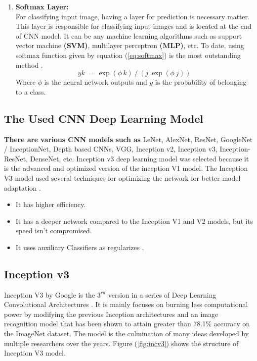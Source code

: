 \begin{enumerate}
    \item {\bf Softmax Layer:} \\[5pt]
        For classifying input image, having a layer for prediction is necessary matter. 
        This layer is responsible for classifying input images and is located at the end 
        of CNN model. It can be any machine learning algorithms such as support vector machine 
        {\bf (SVM)}, multilayer perceptron {\bf (MLP)}, etc. To date, using softmax function given by 
        equation (\ref{eq:softmax}) is the most outstanding method \cite{esr20}. 
        \begin{equation} \label{eq:softmax}
            yk \ = \ \exp(\phi \ k) \ / \ (j \ \exp(\phi \ j)) 
        \end{equation}
        Where $\phi$ is the neural network outputs and $y$ is the probability of belonging to a class.
\end{enumerate}

\subsection{The Used CNN Deep Learning Model}
{\bf There are various CNN models such as} LeNet, AlexNet, ResNet, 
GoogleNet / InceptionNet, Depth based CNNs, VGG, Inception v2, 
Inception v3, Inception-ResNet, DenseNet, etc. Inception v3 
deep learning model was selected because it is the advanced 
and optimized version of the inception V1 model. The Inception 
V3 model used several techniques for optimizing the network for 
better model adaptation \cite{rat18}.
\begin{itemize}
    \item It has higher efficiency.
    \item It has a deeper network compared to the Inception V1 and V2 models, but its speed isn't compromised.
    \item It uses auxiliary Classifiers as regularizes \cite{sam19}.
\end{itemize}

\subsection{Inception v3}
Inception V3 by Google is the $3^{rd}$ version in a series of Deep 
Learning Convolutional Architectures \cite{bar19}. It is mainly focuses 
on burning less computational power by modifying the previous 
Inception architectures and an image recognition model that 
has been shown to attain greater than 78.1\% accuracy on the
ImageNet dataset. The model is the culmination of many ideas 
developed by multiple researchers over the years. Figure (\ref{fig:incv3})
shows the structure of Inception V3 model.

